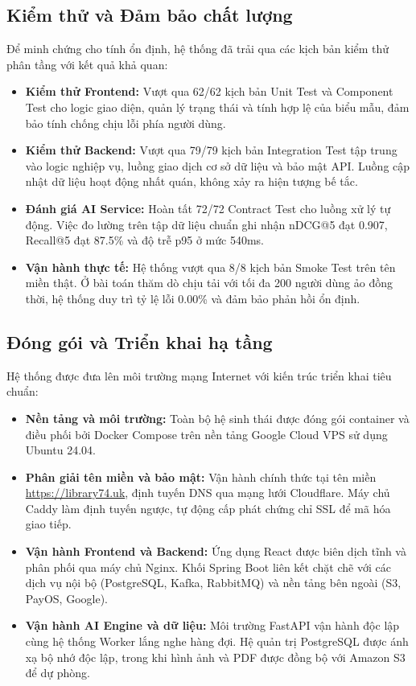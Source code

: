 \subsection{Kiểm thử và Đảm bảo chất lượng}

Để minh chứng cho tính ổn định, hệ thống đã trải qua các kịch bản kiểm thử phân tầng với kết quả khả quan:

\begin{itemize}
    \item \textbf{Kiểm thử Frontend:} Vượt qua 62/62 kịch bản Unit Test và Component Test cho logic giao diện, quản lý trạng thái và tính hợp lệ của biểu mẫu, đảm bảo tính chống chịu lỗi phía người dùng.
    \item \textbf{Kiểm thử Backend:} Vượt qua 79/79 kịch bản Integration Test tập trung vào logic nghiệp vụ, luồng giao dịch cơ sở dữ liệu và bảo mật API. Luồng cập nhật dữ liệu hoạt động nhất quán, không xảy ra hiện tượng bế tắc.
    \item \textbf{Đánh giá AI Service:} Hoàn tất 72/72 Contract Test cho luồng xử lý tự động. Việc đo lường trên tập dữ liệu chuẩn ghi nhận nDCG@5 đạt 0.907, Recall@5 đạt 87.5\% và độ trễ p95 ở mức 540ms.
    \item \textbf{Vận hành thực tế:} Hệ thống vượt qua 8/8 kịch bản Smoke Test trên tên miền thật. Ở bài toán thăm dò chịu tải với tối đa 200 người dùng ảo đồng thời, hệ thống duy trì tỷ lệ lỗi 0.00\% và đảm bảo phản hồi ổn định.
\end{itemize}

\subsection{Đóng gói và Triển khai hạ tầng}

Hệ thống được đưa lên môi trường mạng Internet với kiến trúc triển khai tiêu chuẩn:

\begin{itemize}
    \item \textbf{Nền tảng và môi trường:} Toàn bộ hệ sinh thái được đóng gói container và điều phối bởi Docker Compose trên nền tảng Google Cloud VPS sử dụng Ubuntu 24.04.
    \item \textbf{Phân giải tên miền và bảo mật:} Vận hành chính thức tại tên miền \url{https://library74.uk}, định tuyến DNS qua mạng lưới Cloudflare. Máy chủ Caddy làm định tuyến ngược, tự động cấp phát chứng chỉ SSL để mã hóa giao tiếp.
    \item \textbf{Vận hành Frontend và Backend:} Ứng dụng React được biên dịch tĩnh và phân phối qua máy chủ Nginx. Khối Spring Boot liên kết chặt chẽ với các dịch vụ nội bộ (PostgreSQL, Kafka, RabbitMQ) và nền tảng bên ngoài (S3, PayOS, Google).
    \item \textbf{Vận hành AI Engine và dữ liệu:} Môi trường FastAPI vận hành độc lập cùng hệ thống Worker lắng nghe hàng đợi. Hệ quản trị PostgreSQL được ánh xạ bộ nhớ độc lập, trong khi hình ảnh và PDF được đồng bộ với Amazon S3 để dự phòng.
\end{itemize}

